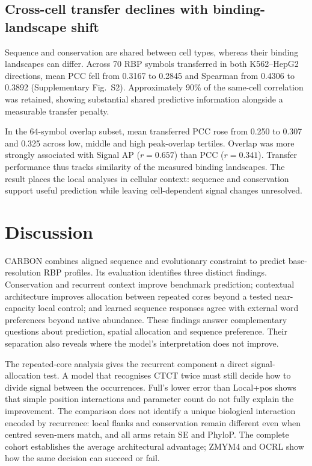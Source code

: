\documentclass[webpdf,contemporary,large]{oup-authoring-template}
\newcommand{\supfig}[1]{Supplementary Fig.~#1}
\begin{document}
\subsection{Cross-cell transfer declines with binding-landscape shift}\label{subsec:transfer}

Sequence and conservation are shared between cell types, whereas their binding landscapes can differ. Across 70 RBP symbols transferred in both K562--HepG2 directions, mean PCC fell from 0.3167 to 0.2845 and Spearman from 0.4306 to 0.3892 (\supfig{S2}). Approximately 90\% of the same-cell correlation was retained, showing substantial shared predictive information alongside a measurable transfer penalty.

In the 64-symbol overlap subset, mean transferred PCC rose from 0.250 to 0.307 and 0.325 across low, middle and high peak-overlap tertiles. Overlap was more strongly associated with Signal AP ($r=0.657$) than PCC ($r=0.341$). Transfer performance thus tracks similarity of the measured binding landscapes. The result places the local analyses in cellular context: sequence and conservation support useful prediction while leaving cell-dependent signal changes unresolved.

\section{Discussion}\label{sec:discussion}

CARBON combines aligned sequence and evolutionary constraint to predict base-resolution RBP profiles. Its evaluation identifies three distinct findings. Conservation and recurrent context improve benchmark prediction; contextual architecture improves allocation between repeated cores beyond a tested near-capacity local control; and learned sequence responses agree with external word preferences beyond native abundance. These findings answer complementary questions about prediction, spatial allocation and sequence preference. Their separation also reveals where the model's interpretation does not improve.

The repeated-core analysis gives the recurrent component a direct signal-allocation test. A model that recognises CTCT twice must still decide how to divide signal between the occurrences. Full's lower error than Local+pos shows that simple position interactions and parameter count do not fully explain the improvement. The comparison does not identify a unique biological interaction encoded by recurrence: local flanks and conservation remain different even when centred seven-mers match, and all arms retain SE and PhyloP. The complete cohort establishes the average architectural advantage; ZMYM4 and OCRL show how the same decision can succeed or fail.
\end{document}
